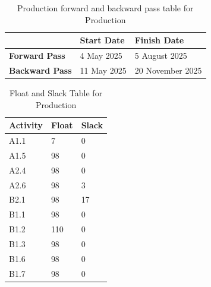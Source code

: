 \documentclass{article}
\begin{document}
  \begin{table}[H]
  \caption{Production forward and backward pass table for Production}
  \centering
  \begin{tabular}{|l|l|l|}
    \hline
    & \textbf{Start Date} & \textbf{Finish Date}  \\
    \hline
        \textbf{Forward Pass} & 4 May 2025 & 5 August 2025 \\
    \hline
        \textbf{Backward Pass} & 11 May 2025 & 20 November 2025 \\
    \hline
  \end{tabular}
  \end{table}
  \begin{table}[H]
    \caption{Float and Slack Table for Production}
    \centering
    \Large
  \begin{tabular}{|l|l|l|}
    \hline
    \textbf{Activity} & \textbf{Float} & \textbf{Slack}  \\ \hline
        \rowcolor{green!10} A1.1 & 7 & 0 \\ \hline
        \rowcolor{green!10} A1.5 & 98  &  0 \\ \hline
        \rowcolor{green!20} A2.4 & 98  &  0 \\ \hline
        \rowcolor{green!20} A2.6 & 98  &  3 \\ \hline
        \rowcolor{blue!10} B2.1 & 98  & 17 \\ \hline
        \rowcolor{blue!10} B1.1 & 98  &  0 \\ \hline
        \rowcolor{blue!10} B1.2 & 110 &  0 \\ \hline
        \rowcolor{blue!10} B1.3 & 98  &  0 \\ \hline
        \rowcolor{blue!10} B1.6 & 98  &  0 \\ \hline
        \rowcolor{blue!10} B1.7 & 98  &  0 \\ \hline


\end{tabular}
\end{table}
\end{document}
